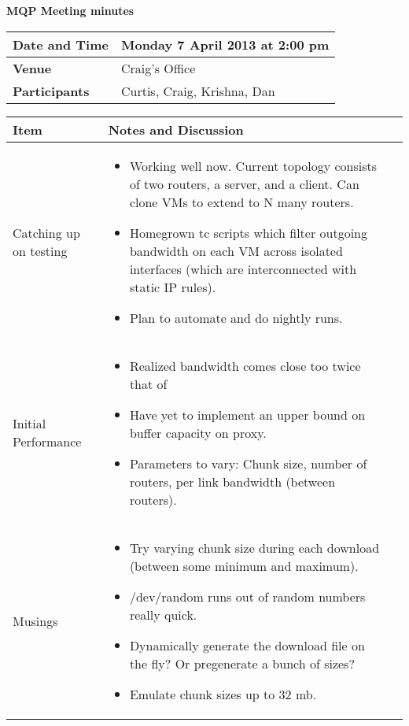 \documentclass[a4wide,10pt]{extarticle}
\begin{document}
\thispagestyle{empty}

\begin{center}
\textbf{MQP Meeting minutes}
\vspace{0.33cm}
\end{center}

\begin{center}
\begin{tabular}{| m{2.8cm} | m{13.6cm} |} \hline
\textbf{Date and Time} & Monday 7 April 2013 at 2:00 pm \\ \hline
\textbf{Venue} & Craig's Office \\ \hline
\textbf{Participants} & Curtis, Craig, Krishna, Dan\\ \hline
\end{tabular}
\end{center}

\vspace{0.5cm}
\begin{center}
\begin{tabular}{| m{3.0cm} | m{12.6cm} | m{2cm}|} \hline
\textbf{Item} & \textbf{Notes and Discussion}\\ \hline

Catching up on testing & 
	\begin{itemize}
		\item Working well now. Current topology consists of two routers, a server, and a client. Can clone VMs to extend to N many routers.
		\item Homegrown tc scripts which filter outgoing bandwidth on each VM across isolated interfaces (which are interconnected with static IP rules).
		\item Plan to automate and do nightly runs. 
	\end{itemize} 
\\ \hline

Initial Performance &
	\begin{itemize}
		\item Realized bandwidth comes close too twice that of 
		\item Have yet to implement an upper bound on buffer capacity on proxy.
		\item Parameters to vary: Chunk size, number of routers, per link bandwidth (between routers).
	\end{itemize}
\\ \hline

Musings & 
	\begin{itemize}
		\item Try varying chunk size during each download (between some minimum and maximum).
		\item /dev/random runs out of random numbers really quick.
		\item Dynamically generate the download file on the fly? Or pregenerate a bunch of sizes?
		\item Emulate chunk sizes up to 32 mb.
	\end{itemize}
\\ \hline

\end{tabular}
\end{center}
\end{document}
